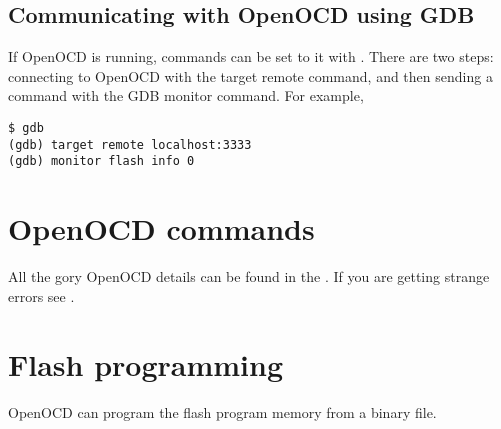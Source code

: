 \subsection{Communicating with OpenOCD using GDB}
\label{communicating-with-openocd-using-gdb}

If OpenOCD is running, commands can be set to it with
. There are two steps: connecting to OpenOCD with
the target remote command, and then sending a command with the GDB
monitor command. For example,

\begin{verbatim}
$ gdb
(gdb) target remote localhost:3333
(gdb) monitor flash info 0
\end{verbatim}

\section{OpenOCD commands}
\label{openocd-commands}

All the gory OpenOCD details can be found in the
. If you are getting strange
errors see .

\section{Flash programming}
\label{flash-programming}

OpenOCD can program the flash program memory from a binary file.




